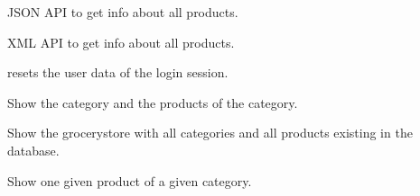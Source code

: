 \documentclass[letterpaper,10pt,english]{sphinxmanual}
\begin{document}

\begin{fulllineitems}
\label{application:application.productsJSON}
JSON API to get info about all products.

\end{fulllineitems}


\begin{fulllineitems}
\label{application:application.productsXML}
XML API to get info about all products.

\end{fulllineitems}


\begin{fulllineitems}
\label{application:application.resetUserSession}
resets the user data of the login session.

\end{fulllineitems}


\begin{fulllineitems}
\label{application:application.showCategory}
Show the category and the products of the category.

\end{fulllineitems}


\begin{fulllineitems}
\label{application:application.showGroceryStore}
Show the grocerystore with all categories
and all products existing in the database.

\end{fulllineitems}


\begin{fulllineitems}
\label{application:application.showProduct}
Show one given product of a given category.

\end{fulllineitems}
\end{document}
